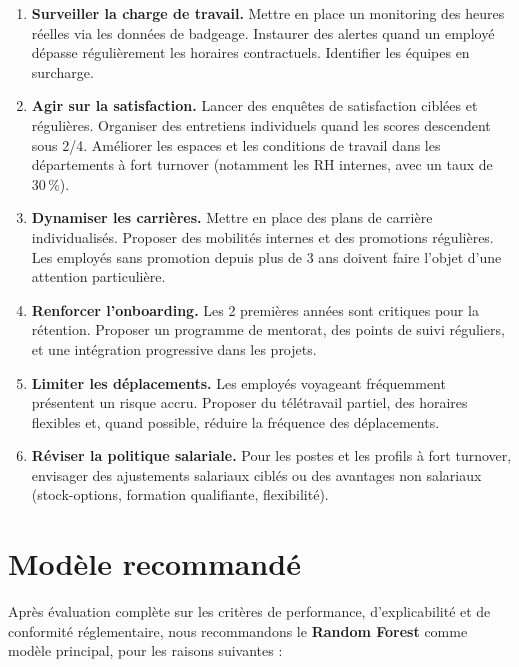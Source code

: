 \documentclass[12pt,a4paper]{article}
\begin{document}
\begin{enumerate}
    \item \textbf{Surveiller la charge de travail.} Mettre en place un monitoring des heures réelles via les données de badgeage. Instaurer des alertes quand un employé dépasse régulièrement les horaires contractuels. Identifier les équipes en surcharge.

    \item \textbf{Agir sur la satisfaction.} Lancer des enquêtes de satisfaction ciblées et régulières. Organiser des entretiens individuels quand les scores descendent sous 2/4. Améliorer les espaces et les conditions de travail dans les départements à fort turnover (notamment les RH internes, avec un taux de 30\,\%).

    \item \textbf{Dynamiser les carrières.} Mettre en place des plans de carrière individualisés. Proposer des mobilités internes et des promotions régulières. Les employés sans promotion depuis plus de 3 ans doivent faire l'objet d'une attention particulière.

    \item \textbf{Renforcer l'onboarding.} Les 2 premières années sont critiques pour la rétention. Proposer un programme de mentorat, des points de suivi réguliers, et une intégration progressive dans les projets.

    \item \textbf{Limiter les déplacements.} Les employés voyageant fréquemment présentent un risque accru. Proposer du télétravail partiel, des horaires flexibles et, quand possible, réduire la fréquence des déplacements.

    \item \textbf{Réviser la politique salariale.} Pour les postes et les profils à fort turnover, envisager des ajustements salariaux ciblés ou des avantages non salariaux (stock-options, formation qualifiante, flexibilité).
\end{enumerate}

\section{Modèle recommandé}

Après évaluation complète sur les critères de performance, d'explicabilité et de conformité réglementaire, nous recommandons le \textbf{Random Forest} comme modèle principal, pour les raisons suivantes :
\end{document}
